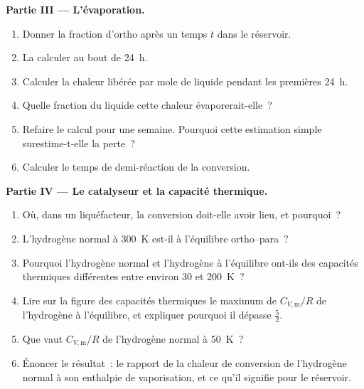 \begin{problem}
\medskip\noindent\textbf{Partie III --- L'évaporation.}
\begin{enumerate}[resume]
  \item Donner la fraction d'ortho après un temps $t$ dans le réservoir.
  \item La calculer au bout de \qty{24}{h}.
  \item Calculer la chaleur libérée par mole de liquide pendant les
        premières \qty{24}{h}.
  \item Quelle fraction du liquide cette chaleur évaporerait-elle~?
  \item Refaire le calcul pour une semaine. Pourquoi cette estimation
        simple surestime-t-elle la perte~?
  \item Calculer le temps de demi-réaction de la conversion.
\end{enumerate}

\medskip\noindent\textbf{Partie IV --- Le catalyseur et la capacité thermique.}
\begin{enumerate}[resume]
  \item Où, dans un liquéfacteur, la conversion doit-elle avoir lieu, et
        pourquoi~?
  \item L'hydrogène normal à \qty{300}{K} est-il à l'équilibre
        ortho--para~?
  \item Pourquoi l'hydrogène normal et l'hydrogène à l'équilibre ont-ils
        des capacités thermiques différentes entre environ 30 et
        \qty{200}{K}~?
  \item Lire sur la figure des capacités thermiques le maximum de
        $C_{V,\mathrm m}/R$ de l'hydrogène à l'équilibre, et expliquer
        pourquoi il dépasse $\frac52$.
  \item Que vaut $C_{V,\mathrm m}/R$ de l'hydrogène normal à
        \qty{50}{K}~?
  \item Énoncer le résultat~: le rapport de la chaleur de conversion de
        l'hydrogène normal à son enthalpie de vaporisation, et ce qu'il
        signifie pour le réservoir.
\end{enumerate}
\end{problem}
